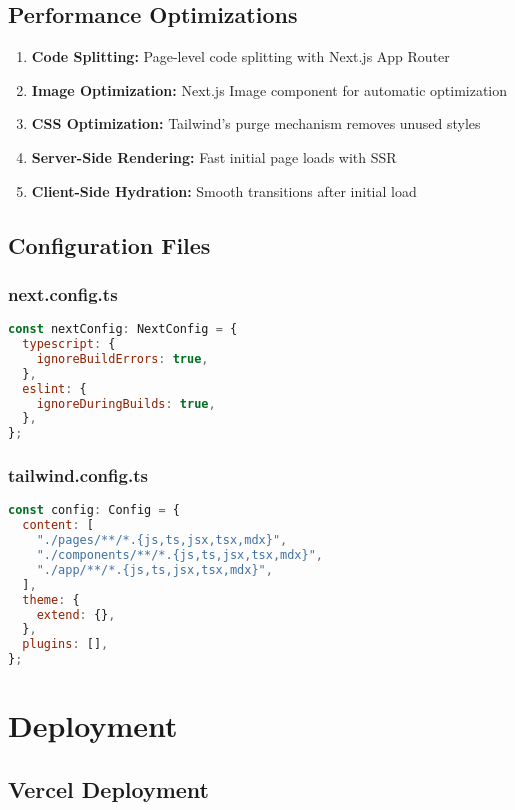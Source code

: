 \documentclass[12pt,a4paper]{article}
\begin{document}
\subsection{Performance Optimizations}

\begin{enumerate}
    \item \textbf{Code Splitting:} Page-level code splitting with Next.js App Router
    \item \textbf{Image Optimization:} Next.js Image component for automatic optimization
    \item \textbf{CSS Optimization:} Tailwind's purge mechanism removes unused styles
    \item \textbf{Server-Side Rendering:} Fast initial page loads with SSR
    \item \textbf{Client-Side Hydration:} Smooth transitions after initial load
\end{enumerate}

\subsection{Configuration Files}

\subsubsection{next.config.ts}
\begin{lstlisting}[language=JavaScript]
const nextConfig: NextConfig = {
  typescript: {
    ignoreBuildErrors: true,
  },
  eslint: {
    ignoreDuringBuilds: true,
  },
};
\end{lstlisting}

\subsubsection{tailwind.config.ts}
\begin{lstlisting}[language=JavaScript]
const config: Config = {
  content: [
    "./pages/**/*.{js,ts,jsx,tsx,mdx}",
    "./components/**/*.{js,ts,jsx,tsx,mdx}",
    "./app/**/*.{js,ts,jsx,tsx,mdx}",
  ],
  theme: {
    extend: {},
  },
  plugins: [],
};
\end{lstlisting}

\section{Deployment}

\subsection{Vercel Deployment}
\end{document}

